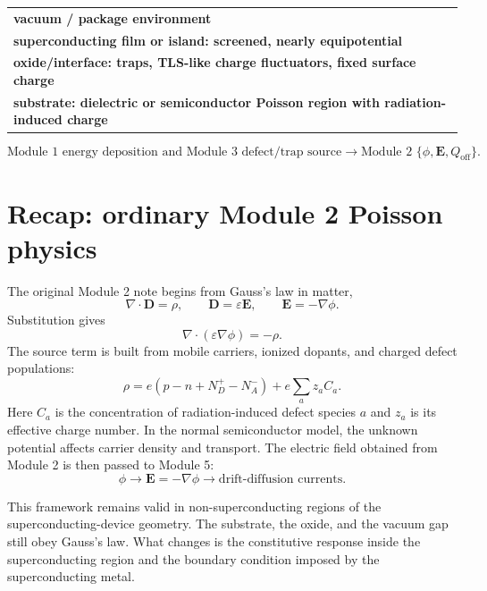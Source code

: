 \documentclass[11pt]{article}
\newcommand{\Evec}{\mathbf{E}}
\newcommand{\Dvec}{\mathbf{D}}
\begin{document}
\begin{center}
\renewcommand{\arraystretch}{1.2}
\begin{tabularx}{0.92\textwidth}{>{\centering\arraybackslash}X}
\rowcolor{SoftBlue}\textbf{vacuum / package environment}\\
\rowcolor{SoftTeal}\textbf{superconducting film or island: screened, nearly equipotential}\\
\rowcolor{SoftGray}\textbf{oxide/interface: traps, TLS-like charge fluctuators, fixed surface charge}\\
\textbf{substrate: dielectric or semiconductor Poisson region with radiation-induced charge}\\
\end{tabularx}
\end{center}
\begin{equation}
\text{Module 1 energy deposition and Module 3 defect/trap source}
\longrightarrow
\text{Module 2 }\{\phi,\Evec,Q_{\mathrm{off}}\}.
\end{equation}

\section{Recap: ordinary Module 2 Poisson physics}

The original Module 2 note begins from Gauss's law in matter,
\begin{equation}
\nabla\cdot\Dvec=\rho,
\qquad
\Dvec=\varepsilon\Evec,
\qquad
\Evec=-\nabla\phi.
\end{equation}
Substitution gives
\begin{equation}
\nabla\cdot(\varepsilon\nabla\phi)=-\rho.
\label{eq:original_poisson}
\end{equation}
The source term is built from mobile carriers, ionized dopants, and charged defect populations:
\begin{equation}
\rho=e(p-n+N_D^+-N_A^-)+e\sum_{a} z_a C_a.
\label{eq:original_rho}
\end{equation}
Here $C_a$ is the concentration of radiation-induced defect species $a$ and $z_a$ is its effective charge number. In the normal semiconductor model, the unknown potential affects carrier density and transport. The electric field obtained from Module 2 is then passed to Module 5:
\begin{equation}
\phi \longrightarrow \Evec=-\nabla\phi \longrightarrow \text{drift-diffusion currents}.
\end{equation}

This framework remains valid in non-superconducting regions of the superconducting-device geometry. The substrate, the oxide, and the vacuum gap still obey Gauss's law. What changes is the constitutive response inside the superconducting region and the boundary condition imposed by the superconducting metal.
\end{document}

